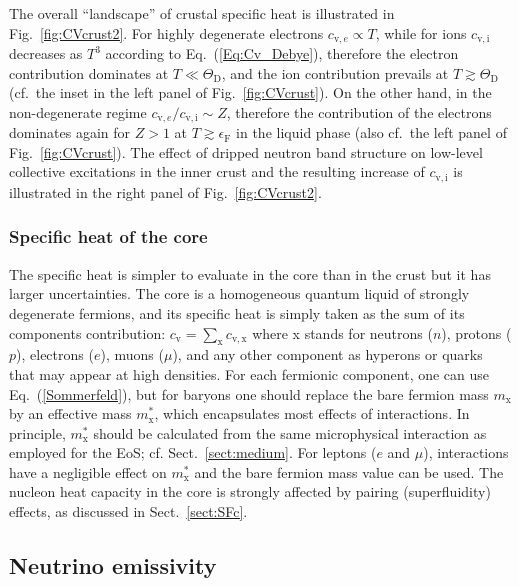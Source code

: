 \documentclass[smallextended]{svjour3}       %
\newcommand{\EF}{\epsilon_\mathrm{F}}
\newcommand{\fig}[1]{Fig.~\ref{#1}}
\newcommand{\req}[1]{Eq.~(\ref{#1})}
\begin{document}
The overall ``landscape'' of crustal specific heat is
illustrated in \fig{fig:CVcrust2}. For highly degenerate
electrons $c_{\mathrm{v},e} \propto T$, while for ions
$c_\mathrm{v,i}$ decreases as $T^3$ according to
\req{Eq:Cv_Debye}, therefore the electron contribution
dominates at $T \ll \Theta_\mathrm{D}$, and the ion contribution
prevails at $T\gtrsim\Theta_\mathrm{D}$ (cf.~the inset in
the left panel of \fig{fig:CVcrust}). On the other hand, in the
non-degenerate regime $c_{\mathrm{v},e}/c_\mathrm{v,i}\sim Z$,
therefore the contribution of the electrons dominates again
for $Z>1$  at $T \gtrsim \EF$ in the liquid phase (also cf.~the
left panel of \fig{fig:CVcrust}). The effect of dripped
neutron band structure on low-level collective excitations
in the inner crust and the resulting increase of
$c_\mathrm{v,i}$ is illustrated in the right panel of
\fig{fig:CVcrust2}.

\subsubsection{Specific heat of the core}
\label{sect:CVcore}

The specific heat is simpler to evaluate in the core than in
the crust but it has larger uncertainties. The core is a
homogeneous quantum liquid of strongly degenerate fermions,
and its specific heat is simply taken as the sum of its
components contribution: $c_\mathrm{v} = \sum_\mathrm{x}
c_\mathrm{v,x}$ where x stands for neutrons ($n$), protons
($p$), electrons ($e$), muons ($\mu$), and any other
component as hyperons or quarks that may appear at high
densities. For each fermionic component, one can use
\req{Sommerfeld}, but for baryons one should replace the bare
fermion mass $m_\mathrm{x}$ by an effective mass
$m_\mathrm{x}^*$, which encapsulates most effects of
interactions. In principle, $m_\mathrm{x}^*$ should be
calculated from the same microphysical interaction as
employed for the EoS; cf.{} Sect.~\ref{sect:medium}. For
leptons ($e$ and $\mu$), interactions have a negligible
effect on $m_\mathrm{x}^*$ and the bare fermion mass value
can be used. The nucleon heat capacity in the core is
strongly affected by pairing (superfluidity) effects, 
as discussed in Sect.~\ref{sect:SFc}.

\subsection{Neutrino emissivity}
\label{sect:nu}
\end{document}
